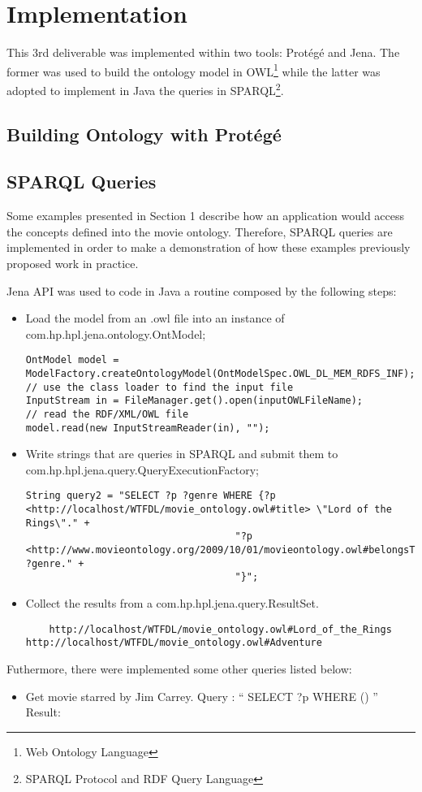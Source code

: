 \documentclass[a4paper,10pt]{article}
\begin{document}
\section{Implementation}

This 3rd deliverable was implemented within two tools: Protégé\cite{protege} and Jena\cite{jena}. The former was used to build the ontology model in OWL\footnote{Web Ontology Language} while the latter was adopted to implement in Java the queries in SPARQL\footnote{SPARQL Protocol and RDF Query Language}.

\subsection{Building Ontology with Protégé}

\subsection{SPARQL Queries}
Some examples presented in Section 1 describe how an application would access the concepts defined into the movie ontology.
Therefore, SPARQL queries are implemented in order to make a demonstration of how these examples previously proposed work in practice.

Jena API was used to code in Java a routine composed by the following steps:

\begin{itemize}
  \item Load the model from an .owl file into an instance of com.hp.hpl.jena.ontology.OntModel;
\begin{lstlisting}
OntModel model = ModelFactory.createOntologyModel(OntModelSpec.OWL_DL_MEM_RDFS_INF);
// use the class loader to find the input file
InputStream in = FileManager.get().open(inputOWLFileName);
// read the RDF/XML/OWL file
model.read(new InputStreamReader(in), "");
\end{lstlisting}

  \item Write strings that are queries in SPARQL and submit them to com.hp.hpl.jena.query.QueryExecutionFactory;
\begin{lstlisting}
String query2 = "SELECT ?p ?genre WHERE {?p <http://localhost/WTFDL/movie_ontology.owl#title> \"Lord of the Rings\"." +
									"?p <http://www.movieontology.org/2009/10/01/movieontology.owl#belongsToGenre> ?genre." +
									"}";
\end{lstlisting}

  \item Collect the results from a com.hp.hpl.jena.query.ResultSet.
\begin{lstlisting}
	http://localhost/WTFDL/movie_ontology.owl#Lord_of_the_Rings	http://localhost/WTFDL/movie_ontology.owl#Adventure	
\end{lstlisting}

\end{itemize}

Futhermore, there were implemented some other queries listed below:

\begin{itemize}
 \item Get movie starred by Jim Carrey.
    Query : `` SELECT ?p WHERE ()  ''
    Result:

\end{itemize}
\end{document}
